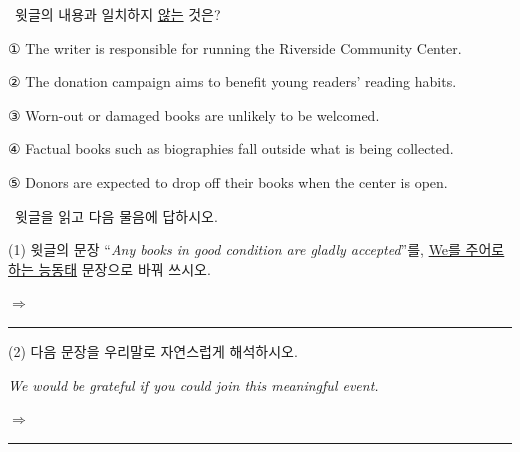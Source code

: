 \documentclass[11pt,a4paper]{article}
\newcommand{\qno}[1]{\par\vspace{8pt}\noindent{\sffamily\bfseries #1.}\ }
\newcommand{\instr}[1]{{\sffamily #1}\par\vspace{3pt}}
\begin{document}
\qno{3}\instr{윗글의 내용과 일치하지 \underline{않는} 것은?}
\begin{choices}
\item ① The writer is responsible for running the Riverside Community Center.
\item ② The donation campaign aims to benefit young readers' reading habits.
\item ③ Worn-out or damaged books are unlikely to be welcomed.
\item ④ Factual books such as biographies fall outside what is being collected.
\item ⑤ Donors are expected to drop off their books when the center is open.
\end{choices}

\qno{4}\instr{[서술형] 윗글을 읽고 다음 물음에 답하시오.}
\vspace{2pt}\par\noindent
(1) 윗글의 문장 ``\textit{Any books in good condition are gladly accepted}''를, \underline{We를 주어로 하는 능동태} 문장으로 바꿔 쓰시오.
\par\vspace{4pt}\noindent
$\Rightarrow$ \rule{11cm}{0.4pt}
\vspace{10pt}\par\noindent
(2) 다음 문장을 우리말로 자연스럽게 해석하시오.
\par\vspace{2pt}\noindent
\hspace{1em}\textit{We would be grateful if you could join this meaningful event.}
\par\vspace{4pt}\noindent
$\Rightarrow$ \rule{\linewidth}{0.4pt}
\end{document}
